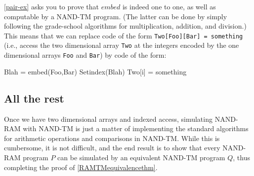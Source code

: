 \cref{pair-ex} asks you to prove that \(embed\) is indeed one to one, as
well as computable by a NAND-TM program. (The latter can be done by
simply following the grade-school algorithms for multiplication,
addition, and division.) This means that we can replace code of the form
\texttt{Two[Foo][Bar] = something} (i.e., access the two dimensional
array \texttt{Two} at the integers encoded by the one dimensional arrays
\texttt{Foo} and \texttt{Bar}) by code of the form:

\begin{code}
Blah = embed(Foo,Bar)
Setindex(Blah)
Two[i] = something
\end{code}

\subsection{All the rest}\label{All-the-rest}

Once we have two dimensional arrays and indexed access, simulating
NAND-RAM with NAND-TM is just a matter of implementing the standard
algorithms for arithmetic operations and comparisons in NAND-TM. While
this is cumbersome, it is not difficult, and the end result is to show
that every NAND-RAM program \(P\) can be simulated by an equivalent
NAND-TM program \(Q\), thus completing the proof of
\cref{RAMTMequivalencethm}.

